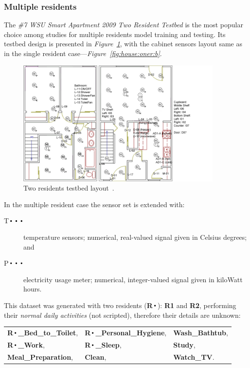 \documentclass[10pt, a4paper, pdflatex, leqno, twoside, openright]{report}
\DeclareMathOperator*{\Bigcdot}{\scalerel*{\cdot}{\bigodot}}
\begin{document}
      \subsubsection{Multiple residents}
The \emph{\#7 WSU Smart Apartment 2009 Two Resident Testbed} is the most popular choice among studies for multiple residents model training and testing. Its testbed design is presented in \emph{Figure~\ref{fig:house:twor}}, with the cabinet sensors layout same as in the single resident case---\emph{Figure~\ref{fig:house:oner:b}}.\\
\begin{figure}[htb]
  \centering%
  \includegraphics[height=6.3cm]{gfx/sensorlayoutTWOR.jpg}
  \caption[Two residents test-bed sensor layout.]{Two residents testbed layout~\citep{cook2009assessing}.\label{fig:house:twor}}
\end{figure}

In the multiple resident case the sensor set is extended with:
\begin{description}
\item[T$\Bigcdot\Bigcdot\Bigcdot$] temperature sensors; numerical, real-valued signal given in Celsius degrees; and
\item[P$\Bigcdot\Bigcdot\Bigcdot$] electricity usage meter; numerical, integer-valued signal given in kiloWatt hours.
\end{description}

This dataset was generated with two residents (\textbf{R$\Bigcdot$}): \textbf{R1} and \textbf{R2}, performing their \emph{normal daily activities} (not scripted), therefore their details are unknown:\\[1em]
\begin{tabular}{ l l l }
  \textbf{R$\Bigcdot$\_Bed\_to\_Toilet}, & \textbf{R$\Bigcdot$\_Personal\_Hygiene}, & \textbf{Wash\_Bathtub}, \\
  \textbf{R$\Bigcdot$\_Work}, & \textbf{R$\Bigcdot$\_Sleep}, & \textbf{Study}, \\
  \textbf{Meal\_Preparation}, & \textbf{Clean}, & \textbf{Watch\_TV}. \\
\end{tabular}
~\\[1em]
\end{document}
